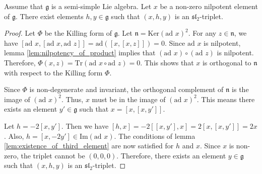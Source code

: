 \begin{theorem}
    \label{thm:jacobson_morozov}
    Assume that $\mathfrak{g}$ is a semi-simple Lie algebra. Let $x$ be a non-zero nilpotent element of $\mathfrak{g}$. There exist elements $h, y \in \mathfrak{g}$ such that $(x, h, y)$ is an $\mathfrak{sl}_2$-triplet.
\end{theorem}

\begin{proof}
    Let $\Phi$ be the Killing form of $\mathfrak{g}$. Let $\mathfrak{n} = \text{Ker}(\text{ad } x)^2$. For any $z \in \mathfrak{n}$, we have $[\text{ad } x, [\text{ad } x, \text{ad } z]] = \text{ad}([x, [x, z]]) = 0$. Since $\text{ad } x$ is nilpotent, lemma \ref{lem:nilpotency_of_product} implies that $(\text{ad } x) \circ (\text{ad } z)$ is nilpotent. Therefore, $\Phi(x, z) = \text{Tr}(\text{ad } x \circ \text{ad } z) = 0$. This shows that $x$ is orthogonal to $\mathfrak{n}$ with respect to the Killing form $\Phi$.

    Since $\Phi$ is non-degenerate and invariant, the orthogonal complement of $\mathfrak{n}$ is the image of $(\text{ad } x)^2$. Thus, $x$ must be in the image of $(\text{ad } x)^2$. This means there exists an element $y' \in \mathfrak{g}$ such that $x = [x, [x, y']]$.

    Let $h = -2[x, y']$. Then we have $[h, x] = -2[[x, y'], x] = 2[x, [x, y']] = 2x$. Also, $h = [x, -2y'] \in \text{Im}(\text{ad } x)$. The conditions of lemma \ref{lem:existence_of_third_element} are now satisfied for $h$ and $x$. Since $x$ is non-zero, the triplet cannot be $(0,0,0)$. Therefore, there exists an element $y \in \mathfrak{g}$ such that $(x, h, y)$ is an $\mathfrak{sl}_2$-triplet.
\end{proof}
